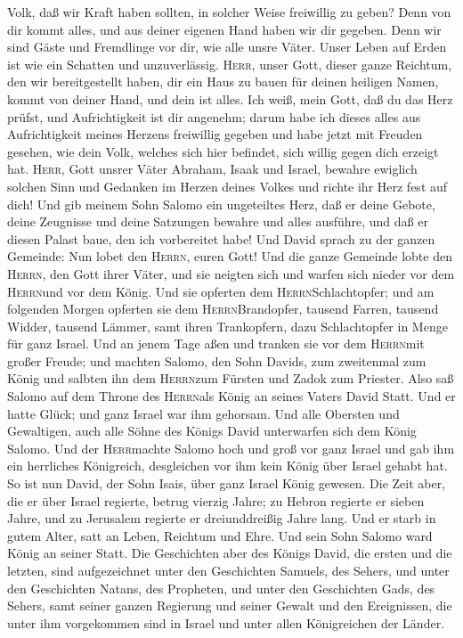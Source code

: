 Volk, daß wir Kraft haben sollten, in solcher Weise freiwillig zu geben?
Denn von dir kommt alles, und aus deiner eigenen Hand haben wir dir
gegeben.  Denn wir sind Gäste und Fremdlinge vor dir, wie
alle unsre Väter. Unser Leben auf Erden ist wie ein Schatten und
unzuverlässig.  \textsc{Herr}, unser Gott, dieser ganze
Reichtum, den wir bereitgestellt haben, dir ein Haus zu bauen für deinen
heiligen Namen, kommt von deiner Hand, und dein ist alles.
 Ich weiß, mein Gott, daß du das Herz prüfst, und
Aufrichtigkeit ist dir angenehm; darum habe ich dieses alles aus
Aufrichtigkeit meines Herzens freiwillig gegeben und habe jetzt mit
Freuden gesehen, wie dein Volk, welches sich hier befindet, sich willig
gegen dich erzeigt hat.  \textsc{Herr}, Gott unsrer Väter
Abraham, Isaak und Israel, bewahre ewiglich solchen Sinn und Gedanken im
Herzen deines Volkes und richte ihr Herz fest auf dich! 
Und gib meinem Sohn Salomo ein ungeteiltes Herz, daß er deine Gebote,
deine Zeugnisse und deine Satzungen bewahre und alles ausführe, und daß
er diesen Palast baue, den ich vorbereitet habe!  Und
David sprach zu der ganzen Gemeinde: Nun lobet den \textsc{Herrn}, euren
Gott! Und die ganze Gemeinde lobte den \textsc{Herrn}, den Gott ihrer
Väter, und sie neigten sich und warfen sich nieder vor dem
\textsc{Herrn}und vor dem König.  Und sie opferten dem
\textsc{Herrn}Schlachtopfer; und am folgenden Morgen opferten sie dem
\textsc{Herrn}Brandopfer, tausend Farren, tausend Widder, tausend
Lämmer, samt ihren Trankopfern, dazu Schlachtopfer in Menge für ganz
Israel.  Und an jenem Tage aßen und tranken sie vor dem
\textsc{Herrn}mit großer Freude; und machten Salomo, den Sohn Davids,
zum zweitenmal zum König und salbten ihn dem \textsc{Herrn}zum Fürsten
und Zadok zum Priester.  Also saß Salomo auf dem Throne
des \textsc{Herrn}als König an seines Vaters David Statt. Und er hatte
Glück; und ganz Israel war ihm gehorsam.  Und alle
Obersten und Gewaltigen, auch alle Söhne des Königs David unterwarfen
sich dem König Salomo.  Und der \textsc{Herr}machte
Salomo hoch und groß vor ganz Israel und gab ihm ein herrliches
Königreich, desgleichen vor ihm kein König über Israel gehabt hat.
 So ist nun David, der Sohn Isais, über ganz Israel König
gewesen.  Die Zeit aber, die er über Israel regierte,
betrug vierzig Jahre; zu Hebron regierte er sieben Jahre, und zu
Jerusalem regierte er dreiunddreißig Jahre lang.  Und er
starb in gutem Alter, satt an Leben, Reichtum und Ehre. Und sein Sohn
Salomo ward König an seiner Statt.  Die Geschichten aber
des Königs David, die ersten und die letzten, sind aufgezeichnet unter
den Geschichten Samuels, des Sehers, und unter den Geschichten Natans,
des Propheten, und unter den Geschichten Gads, des Sehers,
 samt seiner ganzen Regierung und seiner Gewalt und den
Ereignissen, die unter ihm vorgekommen sind in Israel und unter allen
Königreichen der Länder.
